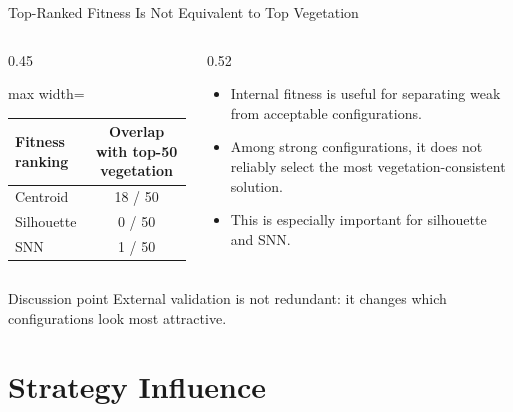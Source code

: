 \documentclass[aspectratio=169,10pt]{beamer}
\begin{document}
\begin{frame}{Top-Ranked Fitness Is Not Equivalent to Top Vegetation}
  \begin{columns}[T]
    \begin{column}{0.45\textwidth}
      \begin{adjustbox}{max width=\textwidth}
      \begin{tabular}{lc}
        \toprule
        Fitness ranking & Overlap with top-50 vegetation \\
        \midrule
        Centroid & 18 / 50 \\
        Silhouette & 0 / 50 \\
        SNN & 1 / 50 \\
        \bottomrule
      \end{tabular}
      \end{adjustbox}
    \end{column}
    \begin{column}{0.52\textwidth}
      \begin{itemize}
        \item Internal fitness is useful for separating weak from acceptable configurations.
        \item Among strong configurations, it does not reliably select the most vegetation-consistent solution.
        \item This is especially important for silhouette and SNN.
      \end{itemize}
    \end{column}
  \end{columns}

  \vspace{1em}
  \begin{block}{Discussion point}
    External validation is not redundant: it changes which configurations look most attractive.
  \end{block}
\end{frame}

\section{Strategy Influence}
\end{document}
